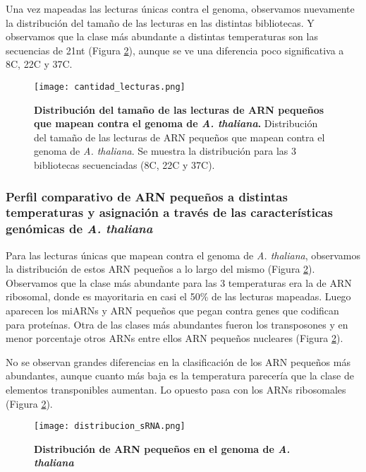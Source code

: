 Una vez mapeadas las lecturas únicas contra el genoma, observamos nuevamente la distribución del tamaño de las lecturas en las distintas bibliotecas.
Y observamos que la clase más abundante a distintas temperaturas son las secuencias de 21nt (Figura \ref{fig:distribucion_sRNA}), aunque se ve una diferencia poco significativa a 8\degree C, 22\degree C y 37\degree C.

\begin{figure}[htbp!] 
    \centering    
    \texttt{[image: cantidad\_lecturas.png]}
    \caption[Distribución del tamaño de las lecturas de ARN pequeños que mapean contra el genoma de \textit{A. thaliana}]{
    \textbf{Distribución del tamaño de las lecturas de ARN pequeños que mapean contra el genoma de \textit{A. thaliana}.}
    Distribución del tamaño de las lecturas de ARN pequeños que mapean contra el genoma de \textit{A. thaliana}.
    Se muestra la distribución para las 3 bibliotecas secuenciadas (8\degree C, 22\degree C y 37\degree C).
   }
     \label{fig:cantidad_lecturas}
\end{figure}


\subsubsection{Perfil comparativo de ARN pequeños a distintas temperaturas y asignación a través de las características genómicas de \textit{A. thaliana}}

Para las lecturas únicas que mapean contra el genoma de \textit{A. thaliana}, observamos la distribución de estos ARN pequeños a lo largo del mismo (Figura \ref{fig:distribucion_sRNA}).
Observamos que la clase más abundante para las 3 temperaturas era la de ARN ribosomal, donde es mayoritaria en casi el 50\% de las lecturas mapeadas.
Luego aparecen los miARNs y ARN pequeños que pegan contra genes que codifican para proteínas.
Otra de las clases más abundantes fueron los transposones y en menor porcentaje otros ARNs entre ellos ARN pequeños nucleares (Figura \ref{fig:distribucion_sRNA}).

No se observan grandes diferencias en la clasificación de los ARN pequeños más abundantes, aunque cuanto más baja es la temperatura parecería que la clase de elementos transponibles aumentan.
Lo opuesto pasa con los ARNs ribosomales (Figura \ref{fig:distribucion_sRNA}).

\begin{figure}[htbp!] 
    \centering    
    \texttt{[image: distribucion\_sRNA.png]}
    \caption[Distribución de ARN pequeños en el genoma de \textit{A. thaliana}]{
    \textbf{Distribución de ARN pequeños en el genoma de \textit{A. thaliana}}
        }
     \label{fig:distribucion_sRNA}
\end{figure}

